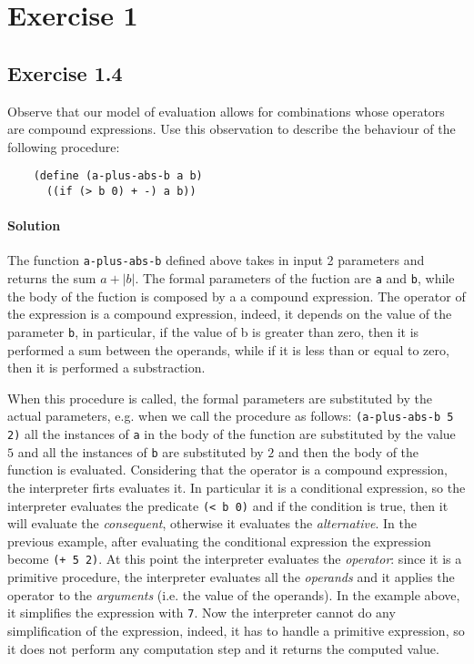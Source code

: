 \section*{Exercise 1}

\subsection*{Exercise 1.4}
Observe that our model of evaluation allows for combinations whose operators are compound expressions. Use this observation to 
describe the behaviour of the following procedure:

\begin{lstlisting}
    (define (a-plus-abs-b a b) 
      ((if (> b 0) + -) a b))
\end{lstlisting}

\paragraph{Solution}
The function \texttt{a-plus-abs-b} defined above takes in input 2 parameters and returns the sum $ a + |b| $. 
The formal parameters of the fuction are \texttt{a} and \texttt{b}, while the body of the fuction is composed by a 
a compound expression. The operator of the expression is a compound expression, indeed, it depends on the value of the
parameter \texttt{b}, in particular, if the value of {b} is greater than zero, then it is performed a sum between the 
operands, while if it is less than or equal to zero, then it is performed a substraction.

When this procedure is called, the formal parameters are substituted by the actual parameters, e.g. when we call the procedure as
follows: \texttt{(a-plus-abs-b 5 2)} all the instances of \texttt{a} in the body of the function are substituted by the value
$ 5 $ and all the instances of \texttt{b} are substituted by $ 2 $ and then the body of the function is evaluated.
Considering that the operator is a compound expression, the interpreter firts evaluates it. 
In particular it is a conditional  expression, so the interpreter evaluates the predicate \texttt{(< b 0)} 
and if the condition is true, then it will evaluate the \textit{consequent}, otherwise it evaluates the \textit{alternative}.
In the previous example, after evaluating the conditional expression the expression become \texttt{(+ 5 2)}.
At this point the interpreter evaluates the \textit{operator}: since it is a primitive procedure, the interpreter evaluates all the 
\textit{operands} and it applies the operator to the \textit{arguments} (i.e. the value of the operands).
In the example above, it simplifies the expression with \texttt{7}.
Now the interpreter cannot do any simplification of the expression, indeed, it has to handle a primitive expression, so 
it does not perform any computation step and it returns the computed value.


